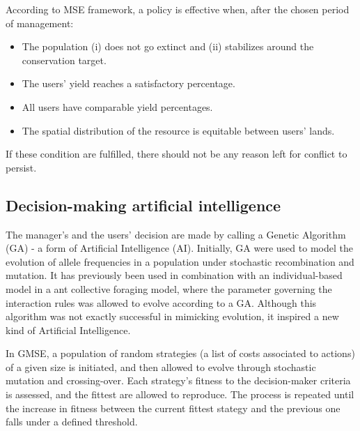 \documentclass[12pt,a4paper]{article}
\begin{document}
According to MSE framework, a policy is effective when, after the chosen period of management:
\begin{itemize}
    \item The population (i) does not go extinct and (ii) stabilizes around the conservation target.
    \item The users' yield reaches a satisfactory percentage.
    \item All users have comparable yield percentages.
    \item The spatial distribution of the resource is equitable between users' lands.
\end{itemize}
If these condition are fulfilled, there should not be any reason left for conflict to persist.

\subsection{Decision-making artificial intelligence}

The manager's and the users' decision are made by calling a Genetic Algorithm (GA) - a form of Artificial Intelligence (AI).
Initially, GA were used to model the evolution of allele frequencies in a population under stochastic recombination and mutation.
It has previously been used in combination with an individual-based model in a ant collective foraging model, where the parameter governing the interaction rules was allowed to evolve according to a GA. \citep{hamblin2013practical}
Although this algorithm was not exactly successful in mimicking evolution, it inspired a new kind of Artificial Intelligence.

In GMSE, a population of random strategies (a list of costs associated to actions) of a given size is initiated, and then allowed to evolve through stochastic mutation and crossing-over.
Each strategy's fitness to the decision-maker criteria is assessed, and the fittest are allowed to reproduce.
The process is repeated until the increase in fitness between the current fittest stategy and the previous one falls under a defined threshold.
\end{document}

